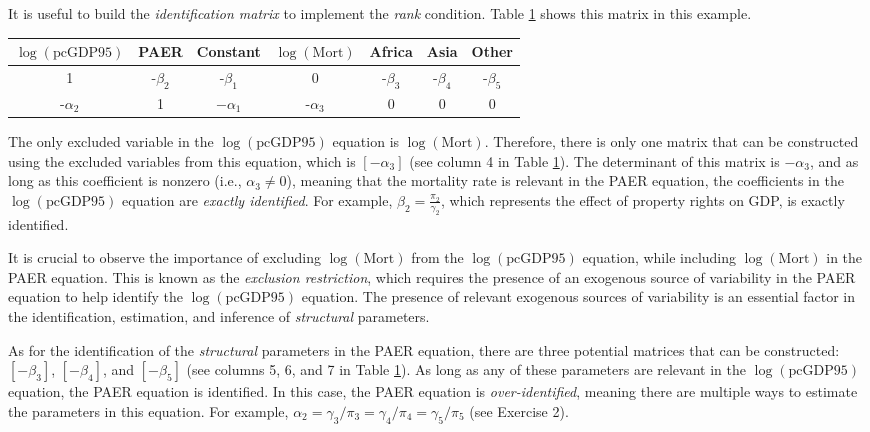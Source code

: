 It is useful to build the \textit{identification matrix} to implement the \textit{rank} condition. Table \ref{tab:71} shows this matrix in this example.

\begin{table}[!h]
	\label{tab:71}%
	\begin{tabular}{ccccccc}
		$\log(\text{pcGDP95})$ & PAER & Constant & $\log(\text{Mort})$ & Africa & Asia & Other \\
		\hline
		1 & -$\beta_2$ & -$\beta_1$ & 0 & -$\beta_3$ & -$\beta_4$ & -$\beta_5$\\
		-$\alpha_2$ & 1 & $-\alpha_1$ & -$\alpha_3$ & 0 & 0 & 0 \\
	\end{tabular}
\end{table}

The only excluded variable in the $\log(\text{pcGDP95})$ equation is $\log(\text{Mort})$. Therefore, there is only one matrix that can be constructed using the excluded variables from this equation, which is $[-\alpha_3]$ (see column 4 in Table \ref{tab:71}). The determinant of this matrix is $-\alpha_3$, and as long as this coefficient is nonzero (i.e., $\alpha_3 \neq 0$), meaning that the mortality rate is relevant in the PAER equation, the coefficients in the $\log(\text{pcGDP95})$ equation are \textit{exactly identified}. For example, $\beta_2 = \frac{\pi_2}{\gamma_2}$, which represents the effect of property rights on GDP, is exactly identified.

It is crucial to observe the importance of excluding $\log(\text{Mort})$ from the $\log(\text{pcGDP95})$ equation, while including $\log(\text{Mort})$ in the PAER equation. This is known as the \textit{exclusion restriction}, which requires the presence of an exogenous source of variability in the PAER equation to help identify the $\log(\text{pcGDP95})$ equation. The presence of relevant exogenous sources of variability is an essential factor in the identification, estimation, and inference of \textit{structural} parameters.

As for the identification of the \textit{structural} parameters in the PAER equation, there are three potential matrices that can be constructed: $[-\beta_3]$, $[-\beta_4]$, and $[-\beta_5]$ (see columns 5, 6, and 7 in Table \ref{tab:71}). As long as any of these parameters are relevant in the $\log(\text{pcGDP95})$ equation, the PAER equation is identified. In this case, the PAER equation is \textit{over-identified}, meaning there are multiple ways to estimate the parameters in this equation. For example, $\alpha_2 = \gamma_3/\pi_3 = \gamma_4/\pi_4 = \gamma_5/\pi_5$ (see Exercise 2).

